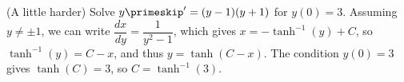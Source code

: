 {(A little harder) Solve $y\primeskip' = (y-1)(y+1)$ for $y(0)=3$.}
{Assuming $y\neq \pm 1$, we can write $\dfrac{dx}{dy} = \dfrac{1}{y^2-1}$, which gives $x = -\tanh^{-1}(y)+C$, so $\tanh^{-1}(y) = C-x$, and thus $y=\tanh(C-x)$. The condition $y(0)=3$ gives $\tanh(C)=3$, so $C=\tanh^{-1}(3)$.}